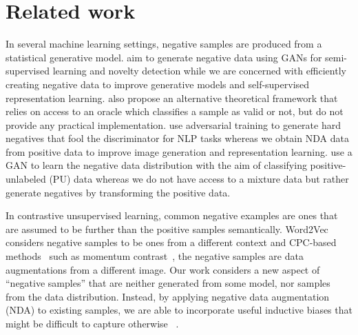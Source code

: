 \documentclass{article} \usepackage{iclr2021_conference,times}
\begin{document}
\begin{table}[!h]
  \caption{Top-1 accuracy results on action recognition in videos w/ and w/o NDA in DPC.}
\label{table:DPC}
  \centering
{}
\end{table}








 
\section{Related work}
In several machine learning settings, negative samples are produced from a statistical generative model. \cite{sung2019difference} aim to generate negative data using GANs for semi-supervised learning and novelty detection while we are concerned with efficiently creating negative data to improve generative models and self-supervised representation learning. \cite{hanneke2018actively} also propose an alternative theoretical framework that relies on access to an oracle which classifies a sample as valid or not, but do not provide any practical implementation. \cite{bose2018adversarial} use adversarial training to generate hard negatives that fool the discriminator for NLP tasks whereas we obtain NDA data from positive data to improve image generation and representation learning. \cite{hou2018generative} use a GAN to learn the negative data distribution with the aim of classifying positive-unlabeled (PU) data whereas we do not have access to a mixture data but rather generate negatives by transforming the positive data.

In contrastive unsupervised learning, common negative examples are ones that are assumed to be further than the positive samples semantically. Word2Vec~\citep{mikolov2013distributed} considers negative samples to be ones from a different context and CPC-based methods~\citep{oord2018representation} such as momentum contrast~\citep{he2019momentum}, the negative samples are data augmentations from a different image. Our work considers a new aspect of ``negative samples'' that are neither generated from some model, nor samples from the data distribution. Instead, by applying negative data augmentation (NDA) to existing samples, we 
are able to incorporate useful inductive biases that might be difficult to capture otherwise
~\citep{zhao2018bias}. 
\end{document}

